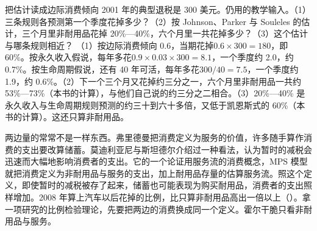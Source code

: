 \begin{example}{把估计读成边际消费倾向}\label{ex:consumption-mpc}
2001 年的典型退税是 300 美元\cite{jps2004}。仍用的教学输入。（1）三条规则各预测第一个季度花掉多少？（2）按 Johnson、Parker 与 Souleles 的估计，三个月里非耐用品花掉 20\%—40\%，六个月里一共花掉多少？（3）这个估计与哪条规则相近？
\solution
（1）按边际消费倾向 0.6，当期花掉$0.6\times300=180$，即 60\%。按永久收入假说，每年多花$0.9\times0.03\times300=8.1$，一个季度约 2.0，约 0.7\%。按生命周期假说，还有 40 年可活，每年多花$300/40=7.5$，一个季度约 1.9，约 0.6\%。（2）下一个三个月又花掉约三分之一，六个月里非耐用品一共约 53\%—73\%（本书的计算），与他们自己说的约三分之二相合\cite{jps2004}。（3）20\%—40\% 是永久收入与生命周期规则预测的约三十到六十多倍，又低于凯恩斯式的 60\%（本书的计算）。这还只算非耐用品。
\end{example}

\begin{pitfall}
两边量的常常不是一样东西。弗里德曼把消费定义为服务的价值，许多随手算作消费的支出要改算储蓄\cite{friedman1957}。莫迪利亚尼与斯坦德尔介绍过一种看法，认为暂时的减税会迅速而大幅地影响消费者的支出\cite{ms1977}。它的一个论证用服务流的消费概念，MPS 模型就把消费定义为非耐用品与服务的支出，加上耐用品存量的估算服务流\cite{ms1977}。照这个定义，即使暂时的减税被存了起来，储蓄也可能表现为购买耐用品，消费者的支出照样增加\cite{ms1977}。2008 年算上汽车以后花掉的比例，比只算非耐用品高出一倍以上（）。拿一项研究的比例检验理论，先要把两边的消费换成同一个定义。霍尔干脆只看非耐用品与服务\cite{hall1978}。
\end{pitfall}

